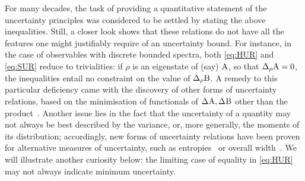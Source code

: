 For many decades, the task of providing a quantitative statement of the uncertainty principles was considered to be settled by stating the above inequalities.
Still, a closer look shows that these relations do not have all the features one might justifiably require of an uncertainty bound. For instance, in the case of observables with discrete bounded spectra, both \eqref{eq:HUR} and \eqref{eq:SUR} reduce to trivialities: if $\rho$ is an eigenstate of (say) $\operatorname{A}$, so that $\sdevr{\opa}=0$, the inequalities entail no constraint on the value of $\sdevr{\opb}$. A remedy to this particular deficiency came with the discovery of other forms of uncertainty relations, based on the minimisation of functionals of $\sdev{\opa}, \sdev{\opb}$ other than the product~\cite{MacconePatti2014PRL,Huang2012}. Another issue lies in the fact that the uncertainty of a quantity may not always be best described by the variance, or, more generally, the moments of its distribution; accordingly, new forms of uncertainty relations have been proven for alternative measures of uncertainty, such as entropies~\cite{Bialynicki-BirulaMycielski1975,Deutsch1983,MaassenUffink1988} or overall width~\cite{UffinkHilgevoord1985}. We will illustrate another curiosity below: the limiting case of equality in \eqref{eq:HUR} may not always indicate minimum uncertainty.

